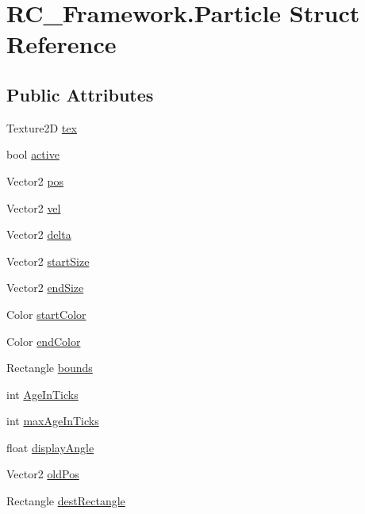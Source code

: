 \hypertarget{struct_r_c___framework_1_1_particle}{}\section{R\+C\+\_\+\+Framework.\+Particle Struct Reference}
\label{struct_r_c___framework_1_1_particle}
\subsection*{Public Attributes}
\begin{DoxyCompactItemize}
\item 
Texture2D \mbox{\hyperlink{struct_r_c___framework_1_1_particle_a1cd07872476a8d325b6fb688d2f232db}{tex}}
\item 
bool \mbox{\hyperlink{struct_r_c___framework_1_1_particle_a2236fb78b02502d5193453c987920189}{active}}
\item 
Vector2 \mbox{\hyperlink{struct_r_c___framework_1_1_particle_aa9e982f839e7cd0e522bfbc279ddf7e3}{pos}}
\item 
Vector2 \mbox{\hyperlink{struct_r_c___framework_1_1_particle_ad0379a0ae705983469f5ed90ce08d98d}{vel}}
\item 
Vector2 \mbox{\hyperlink{struct_r_c___framework_1_1_particle_a93b3995486fca3635adf4a2db4afa21b}{delta}}
\item 
Vector2 \mbox{\hyperlink{struct_r_c___framework_1_1_particle_a133836fe380bdd09a69a654c7e180296}{start\+Size}}
\item 
Vector2 \mbox{\hyperlink{struct_r_c___framework_1_1_particle_a15d5eda3c353b64ad16443b1089a3a49}{end\+Size}}
\item 
Color \mbox{\hyperlink{struct_r_c___framework_1_1_particle_a0a928f777600ee8eb346f80f5d0f3d4b}{start\+Color}}
\item 
Color \mbox{\hyperlink{struct_r_c___framework_1_1_particle_acb7f239f08acb4a4e0c53bd0849a2960}{end\+Color}}
\item 
Rectangle \mbox{\hyperlink{struct_r_c___framework_1_1_particle_a82e9a80660f8bcdb03804e57ef915784}{bounds}}
\item 
int \mbox{\hyperlink{struct_r_c___framework_1_1_particle_a273239c2baefb127c9d53a6187ba70a2}{Age\+In\+Ticks}}
\item 
int \mbox{\hyperlink{struct_r_c___framework_1_1_particle_afa8e89975a3a692cf1015c3e54d02d04}{max\+Age\+In\+Ticks}}
\item 
float \mbox{\hyperlink{struct_r_c___framework_1_1_particle_a99b23db16decf523ea84b80a4c86b6e0}{display\+Angle}}
\item 
Vector2 \mbox{\hyperlink{struct_r_c___framework_1_1_particle_a2b57c82aaf49b701579129b852f8a9bd}{old\+Pos}}
\item 
Rectangle \mbox{\hyperlink{struct_r_c___framework_1_1_particle_adc9af31d046922346d15194d9a4a6f75}{dest\+Rectangle}}
\end{DoxyCompactItemize}


